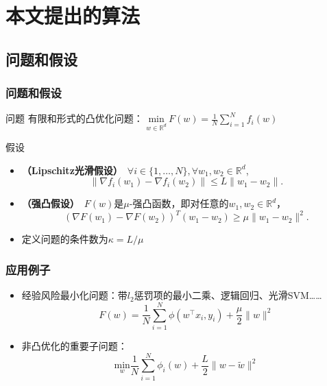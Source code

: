 \section{本文提出的算法}

\subsection{问题和假设}
\frame
{
\frametitle{问题和假设}
\begin{block}{问题}
有限和形式的凸优化问题：
$\underset{w \in \mathbb{R}^d}{\text{min}}\ F(w) = \frac{1}{N}\sum_{i=1}^{N} f_i(w)$
\end{block}

\pause

\begin{block}{假设}
\begin{itemize}
    \item \textbf{（Lipschitz光滑假设）}\
    $\forall i \in \{1, \ldots, N\}, \forall w_1, w_2 \in \mathbb{R}^d$,
    $$
    \| \nabla f_i(w_1) - \nabla f_i(w_2) \| \le L \| w_1 - w_2 \|.
    $$

    \item \textbf{（强凸假设）}\
	$F(w)$是$\mu$-强凸函数，即对任意的$w_1, w_2 \in \mathbb{R}^d$，
    $$
	    (\nabla F(w_1) - \nabla F(w_2))^T(w_1 - w_2) \ge \mu \| w_1 - w_2 \|^2.
    $$

    \item 定义问题的条件数为$\kappa = L / \mu$

\end{itemize}
\end{block}
}

\frame
{
\frametitle{应用例子}
\begin{itemize}
    \item 经验风险最小化问题：带$l_2$惩罚项的最小二乘、逻辑回归、光滑SVM……
    $$
        F(w) = \frac{1}{N}\sum_{i=1}^N\phi(w^\top x_i, y_i) + \frac{\mu}{2}\|w\|^2
    $$
    \item 非凸优化的重要子问题：
    $$
	\underset{w}{\text{min}} \frac{1}{N}\sum_{i=1}^{N}\phi_i(w) + \frac{L}{2}\|w - \tilde{w}\|^2
    $$

\end{itemize}
}


